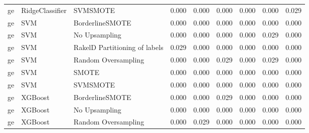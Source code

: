 \begin{tabular}{lllllllll}
      ge &                 RidgeClassifier &                      SVMSMOTE &     0.000 &                     0.000 &                 0.000 &                  0.000 &                                   0.000 &     0.029 \\
      ge &                             SVM &               BorderlineSMOTE &     0.000 &                     0.000 &                 0.000 &                  0.000 &                                   0.000 &     0.000 \\
      ge &                             SVM &                 No Upsampling &     0.000 &                     0.000 &                 0.000 &                  0.000 &                                   0.029 &     0.000 \\
      ge &                             SVM & RakelD Partitioning of labels &     0.029 &                     0.000 &                 0.000 &                  0.000 &                                   0.000 &     0.000 \\
      ge &                             SVM &           Random Oversampling &     0.000 &                     0.000 &                 0.029 &                  0.000 &                                   0.029 &     0.000 \\
      ge &                             SVM &                         SMOTE &     0.000 &                     0.000 &                 0.000 &                  0.000 &                                   0.000 &     0.000 \\
      ge &                             SVM &                      SVMSMOTE &     0.000 &                     0.000 &                 0.000 &                  0.000 &                                   0.000 &     0.000 \\
      ge &                         XGBoost &               BorderlineSMOTE &     0.000 &                     0.000 &                 0.029 &                  0.000 &                                   0.000 &     0.000 \\
      ge &                         XGBoost &                 No Upsampling &     0.000 &                     0.000 &                 0.000 &                  0.000 &                                   0.000 &     0.000 \\
      ge &                         XGBoost &           Random Oversampling &     0.000 &                     0.029 &                 0.000 &                  0.000 &                                   0.000 &     0.000 \\

\end{tabular}
